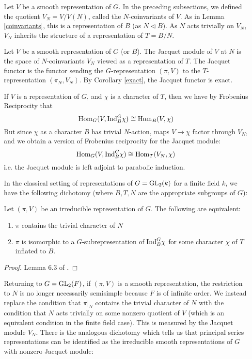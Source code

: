 Let $V$ be a smooth representation of $G$. In the preceding subsections, we defined the quotient $V_N =V/V(N)$, called the $N$-coinvariants of $V$. As in Lemma \ref{coinvariants}, this is a representation of $B$ (as $N \lhd B$). As $N$ acts trivially on $V_N$, $V_N$ inherits the structure of a representation of $T=B/N$.

\begin{defn}
    Let $V$ be a smooth representation of $G$ (or $B$). The Jacquet module of $V$ at $N$ is the space of $N$-coinvariants $V_N$ viewed as a representation of $T$. The Jacquet functor is the functor sending the $G$-representation $(\pi,V)$ to the $T$-representation $(\pi_N,V_N)$. By Corollary \ref{exact}, the Jacquet functor is exact.
\end{defn}

If $V$ is a representation of $G$, and $\chi$ is a character of $T$, then we have by Frobenius Reciprocity that
\[\mathrm{Hom}_G(V, \mathrm{Ind}_B^G \chi) \cong \mathrm{Hom}_B(V, \chi)\]
But since $\chi$ as a character $B$ has trivial $N$-action, maps $V\to \chi$ factor through $V_N$, and we obtain a version of Frobenius reciprocity for the Jacquet module:
\[\mathrm{Hom}_G(V, \mathrm{Ind}_B^G \chi)\cong \mathrm{Hom}_T(V_N, \chi)\]
i.e. the Jacquet module is left adjoint to parabolic induction.

In the classical setting of representations of $G=\mathrm{GL}_2(k)$ for a finite field $k$, we have the following dichotomy (where $B,T,N$ are the appropriate subgroups of $G$):
\begin{lemma}
    Let $(\pi,V)$ be an irreducible representation of $G$. The following are equivalent:
    \begin{enumerate}
        \item $\pi$ contains the trivial character of $N$
        \item $\pi$ is isomorphic to a $G$-subrepresentation of $\mathrm{Ind}_B^G \chi$ for some character $\chi$ of $T$ inflated to $B$.
    \end{enumerate}
\end{lemma}
\begin{proof}
    Lemma 6.3 of \cite{BH1}.
\end{proof}

Returning to $G=\mathrm{GL}_2(F)$, if $(\pi,V)$ is a smooth representation, the restriction to $N$ is no longer necessarily semisimple because $F$ is of infinite order. We instead replace the condition that $\pi |_N$ contains the trivial character of $N$ with the condition that $N$ acts trivially on some nonzero quotient of $V$ (which is an equivalent condition in the finite field case). This is measured by the Jacquet module $V_N$. There is the analogous dichotomy which tells us that principal series representations can be identified as the irreducible smooth representations of $G$ with nonzero Jacquet module: 


